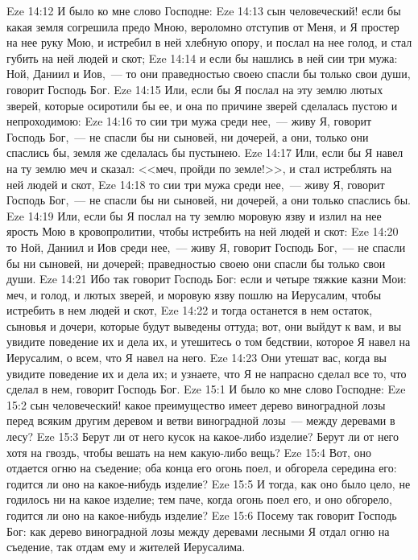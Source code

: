 \vs Eze 14:12 И было ко мне слово Господне:
\vs Eze 14:13 сын человеческий! если бы какая земля согрешила предо Мною, вероломно отступив от Меня, и Я простер на нее руку Мою, и истребил в ней хлебную опору, и послал на нее голод, и стал губить на ней людей и скот;
\vs Eze 14:14 и если бы нашлись в ней сии три мужа: Ной, Даниил и Иов,~--- то они праведностью своею спасли бы только свои души, говорит Господь Бог.
\vs Eze 14:15 Или, если бы Я послал на эту землю лютых зверей, которые осиротили бы ее, и она по причине зверей сделалась пустою и непроходимою:
\vs Eze 14:16 то сии три мужа среди нее,~--- живу Я, говорит Господь Бог,~--- не спасли бы ни сыновей, ни дочерей, а они, только они спаслись бы, земля же сделалась бы пустынею.
\vs Eze 14:17 Или, если бы Я навел на ту землю меч и сказал: <<меч, пройди по земле!>>, и стал истреблять на ней людей и скот,
\vs Eze 14:18 то сии три мужа среди нее,~--- живу Я, говорит Господь Бог,~--- не спасли бы ни сыновей, ни дочерей, а они только спаслись бы.
\vs Eze 14:19 Или, если бы Я послал на ту землю моровую язву и излил на нее ярость Мою в кровопролитии, чтобы истребить на ней людей и скот:
\vs Eze 14:20 то Ной, Даниил и Иов среди нее,~--- живу Я, говорит Господь Бог,~--- не спасли бы ни сыновей, ни дочерей; праведностью своею они спасли бы только свои души.
\vs Eze 14:21 Ибо так говорит Господь Бог: если и четыре тяжкие казни Мои: меч, и голод, и лютых зверей, и моровую язву пошлю на Иерусалим, чтобы истребить в нем людей и скот,
\vs Eze 14:22 и тогда останется в нем остаток, сыновья и дочери, которые будут выведены оттуда; вот, они выйдут к вам, и вы увидите поведение их и дела их, и утешитесь о том бедствии, которое Я навел на Иерусалим, о всем, что Я навел на него.
\vs Eze 14:23 Они утешат вас, когда вы увидите поведение их и дела их; и узнаете, что Я не напрасно сделал все то, что сделал в нем, говорит Господь Бог.
\vs Eze 15:1 И было ко мне слово Господне:
\vs Eze 15:2 сын человеческий! какое преимущество имеет дерево виноградной лозы перед всяким другим деревом и ветви виноградной лозы~--- между деревами в лесу?
\vs Eze 15:3 Берут ли от него кусок на какое-либо изделие? Берут ли от него хотя на гвоздь, чтобы вешать на нем какую-либо вещь?
\vs Eze 15:4 Вот, оно отдается огню на съедение; оба конца его огонь поел, и обгорела середина его: годится ли оно на какое-нибудь изделие?
\vs Eze 15:5 И тогда, как оно было цело, не годилось ни на какое изделие; тем паче, когда огонь поел его, и оно обгорело, годится ли оно на какое-нибудь изделие?
\vs Eze 15:6 Посему так говорит Господь Бог: как дерево виноградной лозы между деревами лесными Я отдал огню на съедение, так отдам ему и жителей Иерусалима.
